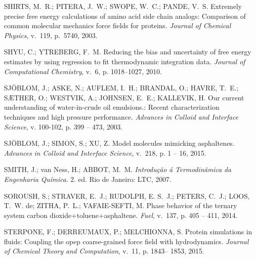 \documentclass[
	12pt,				%
	openany,			%
	oneside,			%
	a4paper,			%
	english,			%
	brazil				%
	]{abntex2}
\begin{document}
\begin{thebibliography}{}
{SHIRTS, M.~R.; PITERA, J.~W.; SWOPE, W.~C.; PANDE, V.~S. Extremely precise
  free energy calculations of amino acid side chain analogs: Comparison of
  common molecular mechanics force fields for proteins.
\emph{Journal of Chemical Physics}, v.~119, p.~5740, 2003.}

{SHYU, C.; YTREBERG, F.~M. Reducing the bias and uncertainty of free energy
  estimates by using regression to fit thermodynamic integration data.
\emph{Journal of Computational Chemistry}, v.~6, p. 1018–1027, 2010.}

{SJ\"{O}BLOM, J.; ASKE, N.; AUFLEM, I.~H.; BRANDAL, O.; HAVRE, T.~E.;
  S\AE{}THER, O.; WESTVIK, A.; JOHNSEN, E.~E.; KALLEVIK, H. Our current
  understanding of water-in-crude oil emulsions.: Recent characterization
  techniques and high pressure performance.
\emph{Advances in Colloid and Interface Science}, v. 100-102, p. 399 -- 473,
  2003.}

{SJ\"{O}BLOM, J.; SIMON, S.; XU, Z. Model molecules mimicking asphaltenes.
\emph{Advances in Colloid and Interface Science}, v.~218, p. 1 -- 16, 2015.}

{SMITH, J.; {van Ness}, H.; ABBOT, M.~M. \emph{Introdu{\c c}{\~a}o \'a
  Termodin{\~a}mica da Engenharia Qu\'imica}. 2. ed. Rio de Janeiro: LTC,
  2007.}

{SOROUSH, S.; STRAVER, E.~J.; RUDOLPH, E. S.~J.; PETERS, C.~J.; LOOS, T.~W. de;
  ZITHA, P.~L.; VAFAIE-SEFTI, M. Phase behavior of the ternary system carbon
  dioxide+toluene+asphaltene.
\emph{Fuel}, v.~137, p. 405 -- 411, 2014.}

{STERPONE, F.; DERREUMAUX, P.; MELCHIONNA, S. Protein simulations in fluids:
  Coupling the opep coarse-grained force field with hydrodynamics.
\emph{Journal of Chemical Theory and Computation}, v.~11, p. 1843– 1853,
  2015.}


\end{thebibliography}
\end{document}
